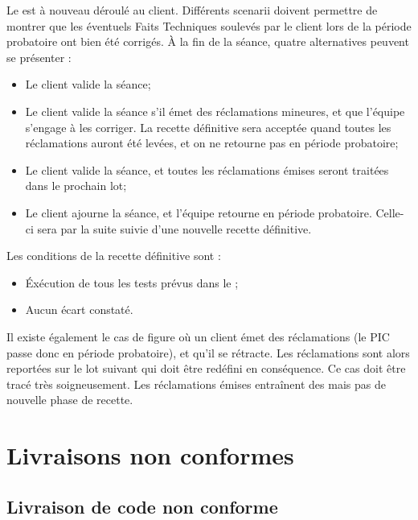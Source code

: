 Le \CDRCourt{} est à nouveau déroulé au client. Différents scenarii doivent permettre de montrer que les éventuels Faits Techniques soulevés par le client lors de la période probatoire ont bien été corrigés. À la fin de la séance, quatre alternatives peuvent se présenter :
\begin{itemize}
\item Le client valide la séance;
\item Le client valide la séance s’il émet des réclamations mineures, et que l’équipe s’engage à les corriger. La recette définitive sera acceptée quand toutes les réclamations auront été levées, et on ne retourne pas en période probatoire;
\item Le client valide la séance, et toutes les réclamations émises seront traitées dans le prochain lot;
\item Le client ajourne la séance, et l’équipe retourne en période probatoire. Celle-ci sera par la suite suivie d’une nouvelle recette définitive. \\
\end{itemize}
Les conditions de la recette définitive sont : 
\begin{itemize}
\item \'Exécution de tous les tests prévus dans le \CDR{};
\item Aucun écart constaté. \\
\end{itemize}

Il existe également le cas de figure où un client émet des réclamations (le PIC passe donc en période probatoire), et qu’il se rétracte. Les réclamations sont alors reportées sur le lot suivant qui doit être redéfini en conséquence. Ce cas doit être tracé très soigneusement. Les réclamations émises entraînent des \FFTCourt{} mais pas de nouvelle phase de recette.

\section{Livraisons non conformes}
\label{livraison}

\subsection{Livraison de code non conforme}

